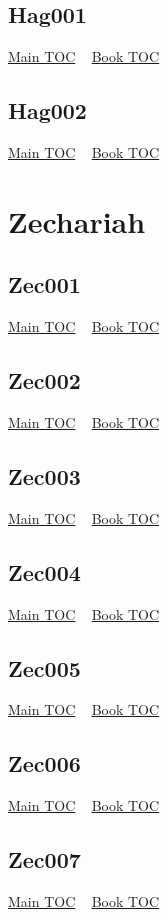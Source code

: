 \documentclass{book}
\begin{document}
  \section{Hag001}\hyperlink{toc}{Main TOC} ~ \hyperref[subsec:Hag]{Book TOC} 
  \section{Hag002}\hyperlink{toc}{Main TOC} ~ \hyperref[subsec:Hag]{Book TOC} 
  \chapter{Zechariah} \label{subsec:Zec} \begin{multicols}{2} \minitoc \end{multicols}
  \section{Zec001}\hyperlink{toc}{Main TOC} ~ \hyperref[subsec:Zec]{Book TOC} 
  \section{Zec002}\hyperlink{toc}{Main TOC} ~ \hyperref[subsec:Zec]{Book TOC} 
  \section{Zec003}\hyperlink{toc}{Main TOC} ~ \hyperref[subsec:Zec]{Book TOC} 
  \section{Zec004}\hyperlink{toc}{Main TOC} ~ \hyperref[subsec:Zec]{Book TOC} 
  \section{Zec005}\hyperlink{toc}{Main TOC} ~ \hyperref[subsec:Zec]{Book TOC} 
  \section{Zec006}\hyperlink{toc}{Main TOC} ~ \hyperref[subsec:Zec]{Book TOC} 
  \section{Zec007}\hyperlink{toc}{Main TOC} ~ \hyperref[subsec:Zec]{Book TOC} 
\end{document}
